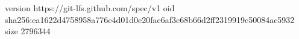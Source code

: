 version https://git-lfs.github.com/spec/v1
oid sha256:ea1622d4758958a776e4d01d0e20fae6af3c68b66d2ff2319919c50084ac5932
size 2796344
